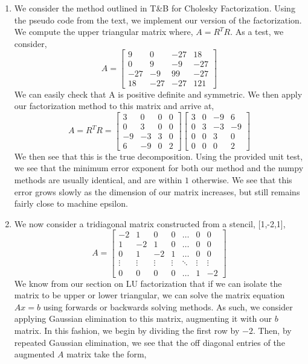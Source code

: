 \documentclass[letterpaper,10pt]{article}
\begin{document}
\begin{enumerate}
\item We consider the method outlined in T\&B for Cholesky Factorization. Using the pseudo code from the text, we implement our version of the factorization. We compute the upper triangular matrix where, $A=R^TR$. As a test, we consider,
\[A=\begin{bmatrix}
9 & 0 & -27 & 18\\
0 & 9 & -9 & -27\\
-27 & -9 & 99 & -27\\
18 & -27 & -27 & 121
\end{bmatrix} \]
We can easily check that A is positive definite and symmetric. We then apply our factorization method to this matrix and arrive at,
\[A=R^TR=\begin{bmatrix}
3 & 0 & 0 & 0\\
0 & 3 & 0 & 0\\
-9 & -3 & 3 & 0\\
6 & -9 & 0 & 2
\end{bmatrix}\begin{bmatrix}
3 & 0 & -9 & 6\\
0 & 3 & -3 & -9\\
0 & 0 & 3 & 0\\
0 & 0 & 0 & 2
\end{bmatrix} \]
We then see that this is the true decomposition. Using the provided unit test, we see that the minimum error exponent for both our method and the numpy methods are usually identical, and are within $1$ otherwise. We see that this error grows slowly as the dimension of our matrix increases, but still remains fairly close to machine epsilon.
\item We now consider a tridiagonal matrix constructed from a stencil, [1,-2,1],
\[A=\begin{bmatrix}
-2 & 1 & 0 & 0 & \ldots & 0 & 0\\
1 & -2 & 1 & 0 & \ldots & 0 & 0\\
0 & 1 & -2 & 1 & \ldots & 0 & 0\\
\vdots & \vdots & \vdots & \vdots & \ddots & \vdots & \vdots\\
0 & 0 & 0 & 0 & \ldots & 1 & -2
\end{bmatrix} \]
We know from our section on LU factorization that if we can isolate the matrix to be upper or lower triangular, we can solve the matrix equation $Ax=b$ using forwards or backwards solving methods. As such, we consider applying Gaussian elimination to this matrix, augmenting it with our $b$ matrix. In this fashion, we begin by dividing the first row by $-2$. Then, by repeated Gaussian elimination, we see that the off diagonal entries of the augmented $A$ matrix take the form,

\end{enumerate}
\end{document}
